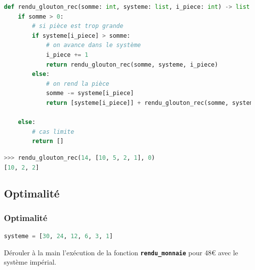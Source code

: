 \documentclass[svgnames,11pt]{beamer}
\begin{document}
\begin{frame}[fragile]
\begin{center}
\begin{lstlisting}[language=Python , basicstyle=\ttfamily\small, xleftmargin=0.2em, xrightmargin=0em]
def rendu_glouton_rec(somme: int, systeme: list, i_piece: int) -> list:
    if somme > 0:
        # si pièce est trop grande
        if systeme[i_piece] > somme:
            # on avance dans le système
            i_piece += 1
            return rendu_glouton_rec(somme, systeme, i_piece)
        else:
            # on rend la pièce
            somme -= systeme[i_piece]
            return [systeme[i_piece]] + rendu_glouton_rec(somme, systeme, i_piece)

    else:
        # cas limite
        return []
\end{lstlisting}
\begin{lstlisting}[language=Python , basicstyle=\ttfamily\small, xleftmargin=0.2em, xrightmargin=0em]
>>> rendu_glouton_rec(14, [10, 5, 2, 1], 0)
[10, 2, 2]
\end{lstlisting}
\end{center}

\end{frame}
\begin{frame}

    \begin{center}
        \label{moncode}
    \end{center}
\end{frame}
\subsection{Optimalité}
\begin{frame}[fragile]
    \frametitle{Optimalité}

    \begin{center}
        \begin{lstlisting}[language=Python]
systeme = [30, 24, 12, 6, 3, 1]
\end{lstlisting}
        \label{systeme}
    \end{center}
    \begin{activite}
        Dérouler à la main l'exécution de la fonction \textbf{\texttt{rendu\_monnaie}} pour 48€ avec le système impérial.
    \end{activite}
\end{frame}
\end{document}
